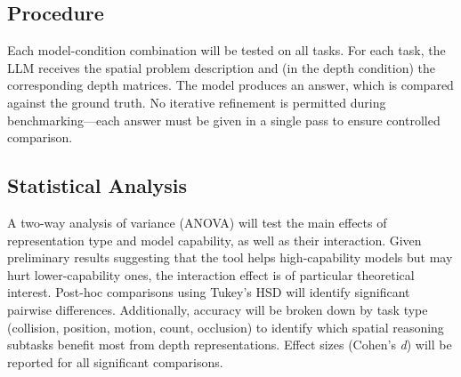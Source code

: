 \documentclass[12pt,a4paper]{article}
\begin{document}
\subsection*{Procedure}

Each model-condition combination will be tested on all tasks. For each task, the LLM receives the spatial problem description and (in the depth condition) the corresponding depth matrices. The model produces an answer, which is compared against the ground truth. No iterative refinement is permitted during benchmarking---each answer must be given in a single pass to ensure controlled comparison.

\subsection*{Statistical Analysis}

A two-way analysis of variance (ANOVA) will test the main effects of representation type and model capability, as well as their interaction. Given preliminary results suggesting that the tool helps high-capability models but may hurt lower-capability ones, the interaction effect is of particular theoretical interest. Post-hoc comparisons using Tukey's HSD will identify significant pairwise differences. Additionally, accuracy will be broken down by task type (collision, position, motion, count, occlusion) to identify which spatial reasoning subtasks benefit most from depth representations. Effect sizes (Cohen's \emph{d}) will be reported for all significant comparisons.
\end{document}
